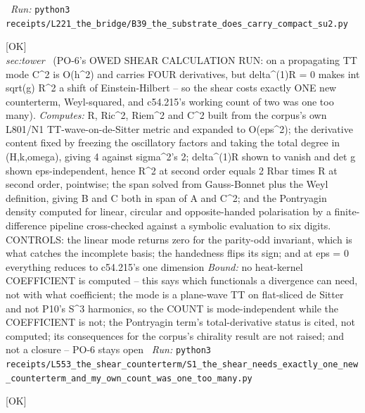 \begin{description}
\ \emph{Run:} \texttt{python3 receipts/L221\_the\_bridge/B39\_the\_substrate\_does\_carry\_compact\_su2.py}
\item[\label{rcpt:S1_the_shear_needs_exactly_one_new_counterterm_and_my_own_count_was_one_too_many}\texttt{S1\_the\_shear\_needs\_exactly\_one\_new\_counterterm\_and\_my\_own\_count\_was\_one\_too\_many}]\hfill\textsf{[OK]}\\
\textit{sec:tower} \ (PO-6's OWED SHEAR CALCULATION RUN: on a propagating TT mode C\textasciicircum{}2 is O(h\textasciicircum{}2) and carries FOUR derivatives, but delta\textasciicircum{}(1)R = 0 makes int sqrt(g) R\textasciicircum{}2 a shift of Einstein-Hilbert -- so the shear costs exactly ONE new counterterm, Weyl-squared, and c54.215's working count of two was one too many). 
\emph{Computes:} R, Ric\textasciicircum{}2, Riem\textasciicircum{}2 and C\textasciicircum{}2 built from the corpus's own L801/N1 TT-wave-on-de-Sitter metric and expanded to O(eps\textasciicircum{}2); the derivative content fixed by freezing the oscillatory factors and taking the total degree in (H,k,omega), giving 4 against sigma\textasciicircum{}2's 2; delta\textasciicircum{}(1)R shown to vanish and det g shown eps-independent, hence R\textasciicircum{}2 at second order equals 2 Rbar times R at second order, pointwise; the span solved from Gauss-Bonnet plus the Weyl definition, giving B and C both in span of A and C\textasciicircum{}2; and the Pontryagin density computed for linear, circular and opposite-handed polarisation by a finite-difference pipeline cross-checked against a symbolic evaluation to six digits. CONTROLS: the linear mode returns zero for the parity-odd invariant, which is what catches the incomplete basis; the handedness flips its sign; and at eps = 0 everything reduces to c54.215's one dimension
 \emph{Bound:} no heat-kernel COEFFICIENT is computed -- this says which functionals a divergence can need, not with what coefficient; the mode is a plane-wave TT on flat-sliced de Sitter and not P10's S\textasciicircum{}3 harmonics, so the COUNT is mode-independent while the COEFFICIENT is not; the Pontryagin term's total-derivative status is cited, not computed; its consequences for the corpus's chirality result are not raised; and not a closure -- PO-6 stays open
\ \emph{Run:} \texttt{python3 receipts/L553\_the\_shear\_counterterm/S1\_the\_shear\_needs\_exactly\_one\_new\_counterterm\_and\_my\_own\_count\_was\_one\_too\_many.py}
\item[\label{rcpt:B40_the_isometry_reaches_colour_not_isospin}\texttt{B40\_the\_isometry\_reaches\_colour\_not\_isospin}]\hfill\textsf{[OK]}\\

\end{description}
